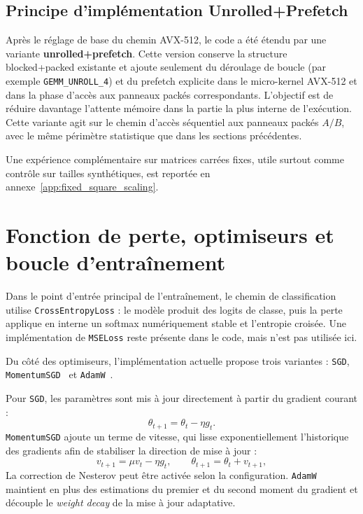 \documentclass[a4paper,11pt,oneside]{article}
\begin{document}
\subsection{Principe d'implémentation Unrolled+Prefetch}

Après le réglage de base du chemin AVX-512, le code a été étendu par une variante \textbf{unrolled+prefetch}. Cette version conserve la structure blocked+packed existante et ajoute seulement du déroulage de boucle (par exemple \texttt{GEMM\_UNROLL\_4}) et du prefetch explicite dans le micro-kernel AVX-512 et dans la phase d'accès aux panneaux packés correspondants. L'objectif est de réduire davantage l'attente mémoire dans la partie la plus interne de l'exécution. Cette variante agit sur le chemin d'accès séquentiel aux panneaux packés $A/B$, avec le même périmètre statistique que dans les sections précédentes.

Une expérience complémentaire sur matrices carrées fixes, utile surtout comme contrôle sur tailles synthétiques, est reportée en annexe~\ref{app:fixed_square_scaling}.


\section{Fonction de perte, optimiseurs et boucle d'entraînement}

Dans le point d'entrée principal de l'entraînement, le chemin de classification utilise \texttt{CrossEntropyLoss} : le modèle produit des logits de classe, puis la perte applique en interne un softmax numériquement stable et l'entropie croisée. Une implémentation de \texttt{MSELoss} reste présente dans le code, mais n'est pas utilisée ici.

Du côté des optimiseurs, l'implémentation actuelle propose trois variantes : \texttt{SGD}, \texttt{MomentumSGD}~\cite{qian1999momentum} et \texttt{AdamW}~\cite{loshchilov2019decoupled}.

Pour \texttt{SGD}, les paramètres sont mis à jour directement à partir du gradient courant :
\[
\theta_{t+1}=\theta_t-\eta g_t.
\]
\texttt{MomentumSGD} ajoute un terme de vitesse, qui lisse exponentiellement l'historique des gradients afin de stabiliser la direction de mise à jour :
\[
v_{t+1}=\mu v_t-\eta g_t,\qquad \theta_{t+1}=\theta_t+v_{t+1},
\]
La correction de Nesterov peut être activée selon la configuration. \texttt{AdamW} maintient en plus des estimations du premier et du second moment du gradient et découple le \emph{weight decay} de la mise à jour adaptative.
\end{document}

